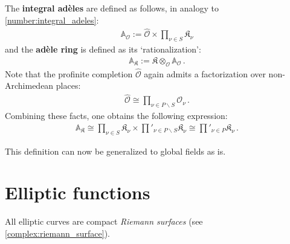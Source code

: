     The \textbf{integral ad\`eles} are defined as follows, in analogy to \cref{number:integral_adeles}:
    \begin{gather}
        \mathbb{A}_{\mathcal{O}} := \widehat{\mathcal{O}}\times\prod_{\nu\in S}\mathfrak{K}_\nu
    \end{gather}
    and the \textbf{ad\`ele ring} is defined as its `rationalization':
    \begin{gather}
        \mathbb{A}_{\mathfrak{K}} := \mathfrak{K}\otimes_{\mathcal{O}}\mathbb{A}_{\mathcal{O}}\,.
    \end{gather}
    Note that the profinite completion $\widehat{\mathcal{O}}$ again admits a factorization over non-Archimedean places:
    \begin{gather}
        \widehat{\mathcal{O}}\cong\prod_{\nu\in P\backslash S}\mathcal{O}_\nu\,.
    \end{gather}
    Combining these facts, one obtains the following expression:
    \begin{gather}
        \mathbb{A}_{\mathfrak{K}}\cong\prod_{\nu\in S}\mathfrak{K}_\nu\times\prod'_{\nu\in P\backslash S}\mathfrak{K}_\nu\cong\prod'_{\nu\in P}\mathfrak{K}_\nu\,.
    \end{gather}

    This definition can now be generalized to global fields as is.

\section{Elliptic functions}

    \begin{property}
        All elliptic curves are compact \textit{Riemann surfaces} (see \cref{complex:riemann_surface}).
    \end{property}


